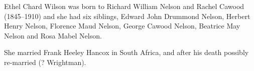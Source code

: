 Ethel Chard Wilson was born to  Richard William Nelson and Rachel Cawood (1845--1910) and she had six siblings,  Edward John Drummond Nelson, Herbert Henry Nelson, Florence Maud Nelson, George Cawood Nelson, Beatrice May Nelson and Rosa Mabel Nelson.

She married Frank Heeley Hancox in South Africa, and after his death possibly re-married (? Wrightman).
